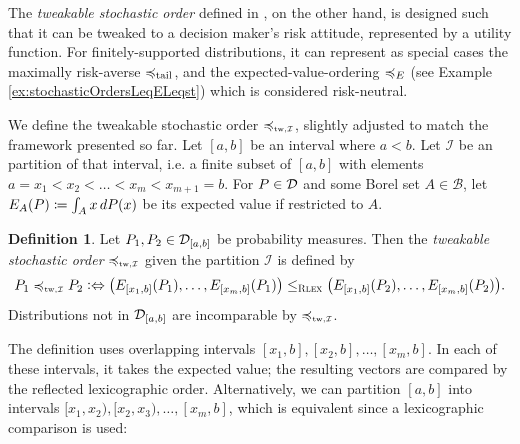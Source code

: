 \documentclass[a4paper,DIV=11,abstracton,twoside=semi]{scrreprt}
\newcommand{\B}{\mathcal{B}}
\theoremstyle{definition}
\newtheorem{defn}[thm]{Definition} %
\begin{document}
    The \emph{tweakable stochastic order} defined in \cite{bib:tweakableStochasticOrders}, on the other hand,
    is designed such that it can be tweaked to a decision maker's risk attitude, represented by a utility function.
    For finitely-supported distributions, it can represent as special cases the maximally risk-averse $\preccurlyeq_{\text{tail}}$, and the expected-value-ordering $\preccurlyeq_E$ (see Example \ref{ex:stochasticOrdersLeqELeqst}) which is considered risk-neutral.
    
    We define the tweakable stochastic order $\leqtw$, slightly adjusted to match the framework presented so far.
    Let $[a, b]$ be an interval where $a < b$. Let $\mathcal{I}$ be an partition of that interval, i.e. a finite subset of $[a, b]$ with elements $a = x_1 < x_2 < \dots < x_m < x_{m+1} = b$.
    For $P \in \mathcal{D}$ and some Borel set $A \in \B$, let $E_A(P) \coloneqq \int_{A} x \, dP(x)$ be its expected value if restricted to $A$.
    \begin{defn}
        \label{def:tweakableStochasticOrder}
        Let $P_1, P_2 \in \mathcal{D}_{[a, b]}$ be probability measures.
        Then the \emph{tweakable stochastic order} $\leqtw$ given the partition $\mathcal{I}$ is defined by
        \begin{gather*}
            P_1 \leqtw P_2 \colonlra \bigpars{E_{[x_1, b]}(P_{1}), \dots, E_{[x_m, b]}(P_1)} \leqRlex \bigpars{E_{[x_1, b]}(P_2), \dots, E_{[x_m, b]}(P_2)}.
        \end{gather*}
        Distributions not in $\mathcal{D}_{[a, b]}$ are incomparable by $\leqtw$.
    \end{defn}

    The definition uses overlapping intervals $[x_1, b], [x_2, b], \dots, [x_m, b]$. In each of these intervals, it takes the expected value; the resulting vectors are compared by the reflected lexicographic order. Alternatively, we can partition $[a, b]$ into intervals $[x_1, x_2), [x_2, x_3), \dots, [x_m, b]$, which is equivalent since a lexicographic comparison is used:
\end{document}
